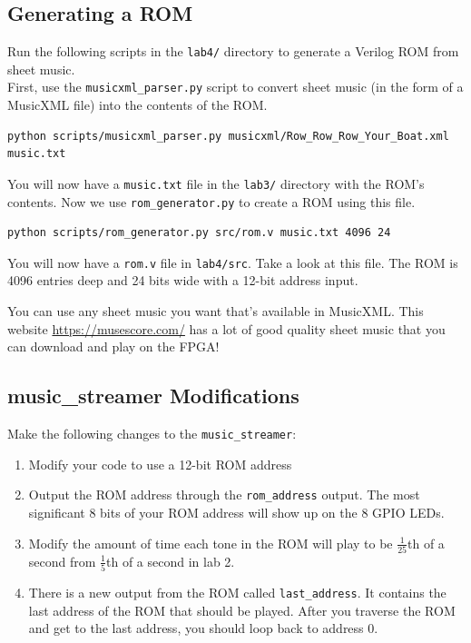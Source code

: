 \documentclass[11pt]{article}
\begin{document}
\subsection{Generating a ROM}
Run the following scripts in the \verb|lab4/| directory to generate a Verilog ROM from sheet music.\\

First, use the \verb|musicxml_parser.py| script to convert sheet music (in the form of a MusicXML file) into the contents of the ROM.

\begin{verbatim}
python scripts/musicxml_parser.py musicxml/Row_Row_Row_Your_Boat.xml music.txt
\end{verbatim}

You will now have a \verb|music.txt| file in the \verb|lab3/| directory with the ROM's contents. Now we use \verb|rom_generator.py| to create a ROM using this file.

\begin{verbatim}
python scripts/rom_generator.py src/rom.v music.txt 4096 24
\end{verbatim}

You will now have a \verb|rom.v| file in \verb|lab4/src|. Take a look at this file. The ROM is 4096 entries deep and 24 bits wide with a 12-bit address input. 

You can use any sheet music you want that's available in MusicXML. This website \url{https://musescore.com/} has a lot of good quality sheet music that you can download and play on the FPGA!

\subsection{music\_streamer Modifications}

Make the following changes to the \verb|music_streamer|:

\begin{enumerate}
	\item Modify your code to use a 12-bit ROM address
	
	\item Output the ROM address through the \verb|rom_address| output. The most significant 8 bits of your ROM address will show up on the 8 GPIO LEDs.
	
	\item Modify the amount of time each tone in the ROM will play to be $\frac{1}{25}$th of a second from $\frac{1}{5}$th of a second in lab 2.
	
	\item There is a new output from the ROM called \verb|last_address|. It contains the last address of the ROM that should be played. After you traverse the ROM and get to the last address, you should loop back to address 0.
\end{enumerate}
\end{document}
